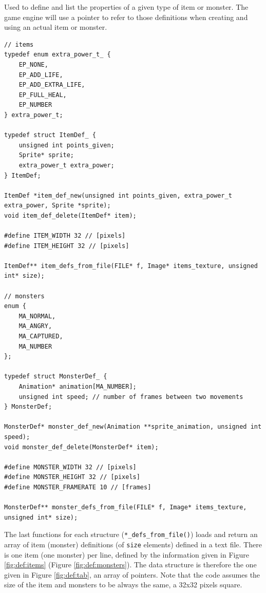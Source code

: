 \documentclass[12pt,a4paper]{article}
\newcommand{\cc}[1]{\texttt{#1}}
\begin{document}
Used to define and list the properties of a given type of item or monster. The game engine will use a pointer to refer to those definitions when creating and using an actual item or monster.

\begin{verbatim}
// items
typedef enum extra_power_t_ {
	EP_NONE,
	EP_ADD_LIFE,
	EP_ADD_EXTRA_LIFE,
	EP_FULL_HEAL,
	EP_NUMBER
} extra_power_t;

typedef struct ItemDef_ {
	unsigned int points_given;
	Sprite* sprite;
	extra_power_t extra_power;
} ItemDef;

ItemDef *item_def_new(unsigned int points_given, extra_power_t extra_power, Sprite *sprite);
void item_def_delete(ItemDef* item);

#define ITEM_WIDTH 32 // [pixels]
#define ITEM_HEIGHT 32 // [pixels]

ItemDef** item_defs_from_file(FILE* f, Image* items_texture, unsigned int* size);

// monsters
enum {
    MA_NORMAL,
    MA_ANGRY,
    MA_CAPTURED,
    MA_NUMBER
};

typedef struct MonsterDef_ {
	Animation* animation[MA_NUMBER];
	unsigned int speed; // number of frames between two movements
} MonsterDef;

MonsterDef* monster_def_new(Animation **sprite_animation, unsigned int speed);
void monster_def_delete(MonsterDef* item);

#define MONSTER_WIDTH 32 // [pixels]
#define MONSTER_HEIGHT 32 // [pixels]
#define MONSTER_FRAMERATE 10 // [frames]

MonsterDef** monster_defs_from_file(FILE* f, Image* items_texture, unsigned int* size);
\end{verbatim}


The last functions for each structure (\cc{*_defs_from_file()}) loads and return an array of item (monster) definitions (of \cc{size} elements) defined in a text file. There is one item (one monster) per line, defined by the information given in Figure \ref{fig:def:items} (Figure \ref{fig:def:monsters}). The data structure is therefore the one given in Figure \ref{fig:def:tab}, an array of pointers. Note that the code assumes the size of the item and monsters to be always the same, a 32x32 pixels square.
\end{document}
